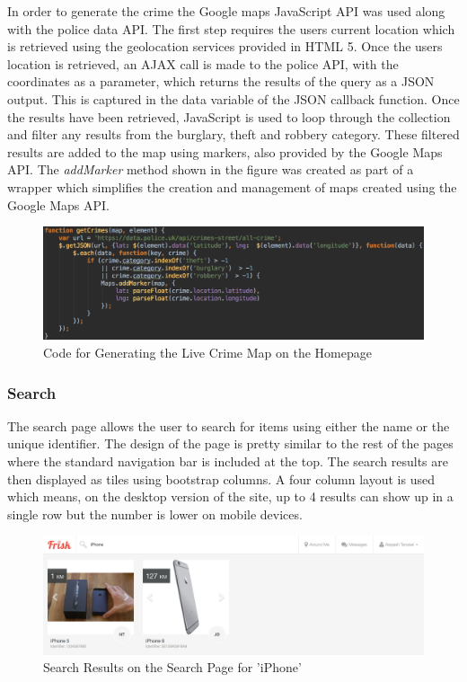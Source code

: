 In order to generate the crime the Google maps JavaScript API was used along with the police data API. The first step requires the users current location which is retrieved using the geolocation services provided in HTML 5. Once the users location is retrieved, an AJAX call is made to the police API, with the coordinates as a parameter, which returns the results of the query as a JSON output. This is captured in the data variable of the JSON callback function. Once the results have been retrieved, JavaScript is used to loop through the collection and filter any results from the burglary, theft and robbery category. These filtered results are added to the map using markers, also provided by the Google Maps API. The \emph{addMarker} method shown in the figure was created as part of a wrapper which simplifies the creation and management of maps created using the Google Maps API.

\begin{figure}[H]
	\centering
	\includegraphics[width=1.0\textwidth]{images/Code/Home_Map}
	\caption{Code for Generating the Live Crime Map on the Homepage} \label{fig:Home_Map_Code}
\end{figure}

\subsubsection{Search}
The search page allows the user to search for items using either the name or the unique identifier. The design of the page is pretty similar to the rest of the pages where the standard navigation bar is included at the top. The search results are then displayed as tiles using bootstrap columns. A four column layout is used which means, on the desktop version of the site, up to 4 results can show up in a single row but the number is lower on mobile devices.

\begin{figure}[H]
	\centering
	\includegraphics[width=1.0\textwidth]{images/Frisk/Search_Results}
	\caption{Search Results on the Search Page for 'iPhone'} \label{fig:Search_Results}
\end{figure}

